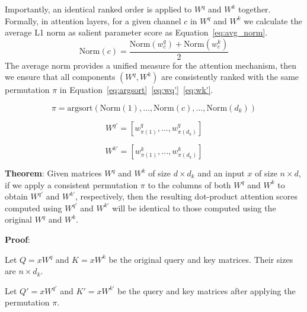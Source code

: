 Importantly, an identical ranked order is applied to $W^q$ and $W^k$ together. Formally, in attention layers, for a given channel $c$ in $W^q$ and $W^k$ we calculate the average L1 norm as salient parameter score as Equation~\ref{eq:avg_norm}.
    \begin{equation}
    \text{Norm}(c) = \frac{\text{Norm}(w^q_c) + \text{Norm}(w^k_c) }{2}
    \label{eq:avg_norm}
    \end{equation}
The average norm provides a unified measure for the attention mechanism, then we ensure that all components $(W^q, W^k)$ are consistently ranked with the same permutation $\pi$ in Equation~\ref{eq:argsort}~\ref{eq:wq'}~\ref{eq:wk'}.

\begin{equation}
 \pi = \text{argsort}(\text{Norm}(1),\ldots, \text{Norm}(c), \ldots, \text{Norm}({d_k})) 
 \label{eq:argsort}
\end{equation}

\begin{equation}
W^{q'} = [w^q_{\pi(1)}, ..., w^q_{\pi(d_k)}] 
\label{eq:wq'}
\end{equation}


\begin{equation}
W^{k'} = [w^k_{\pi(1)}, ..., w^k_{\pi(d_k)}]
\label{eq:wk'}
\end{equation}





\textbf{Theorem}: Given matrices $W^q$ and $W^k$ of size $d \times d_k$ and an input $x$ of size $n \times d$, if we apply a consistent permutation $\pi$ to the columns of both $W^q$ and $W^k$ to obtain $W^{q'}$ and $W^{k'}$, respectively, then the resulting dot-product attention scores computed using $W^{q'}$ and $W^{k'}$ will be identical to those computed using the original $W^q$ and $W^k$.

\textbf{Proof}:

Let $Q = xW^q$ and $K = xW^k$ be the original query and key matrices. Their sizes are $n \times d_k$.

Let $Q' = xW^{q'}$ and $K' = xW^{k'}$ be the query and key matrices after applying the permutation $\pi$. 

